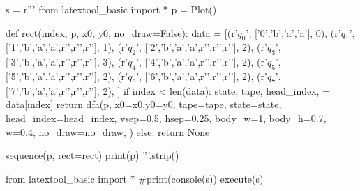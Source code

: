 \newpage
\begin{python}
s = r'''
from latextool_basic import *
p = Plot()

def rect(index, p, x0, y0, no_draw=False):
    data = [(r'$q_0$',
             ['0','b','a','a'],
             0),
            (r'$q_1$',
             ['1','b','a','a',r'\SPACE',r'\SPACE',r'\SPACE'],
             1),
            (r'$q_2$',
             ['2','b','a','a',r'\SPACE',r'\SPACE',r'\SPACE'],
             2),
            (r'$q_3$',
             ['3','b','a','a',r'\SPACE',r'\SPACE',r'\SPACE'],
             3),
            (r'$q_4$',
             ['4','b','a','a',r'\SPACE',r'\SPACE',r'\SPACE'],
             2),
            (r'$q_5$',
             ['5','b','a','a',r'\SPACE',r'\SPACE',r'\SPACE'],
             2),
            (r'$q_6$',
             ['6','b','a','a',r'\SPACE',r'\SPACE',r'\SPACE'],
             2),
            (r'$q_7$',
             ['7','b','a','a',r'\SPACE',r'\SPACE',r'\SPACE'],
             2),
            ]
    if index < len(data):
        state, tape, head_index, = data[index]    
        return dfa(p,
               x0=x0,y0=y0,
               tape=tape,
               state=state,
               head_index=head_index,
               vsep=0.5, hsep=0.25,
               body_w=1, body_h=0.7, w=0.4,
               no_draw=no_draw,
               )
    else:
        return None

sequence(p, rect=rect)
print(p)
'''.strip()

from latextool_basic import *
#print(console(s))
execute(s)
\end{python}

